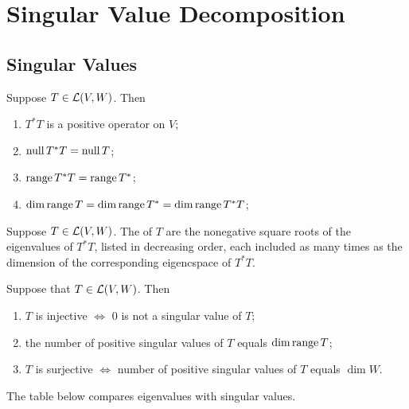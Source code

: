 \section{Singular Value Decomposition}

\subsection{Singular Values}

\begin{thm}[properties of $T*T$]
  \label{thm: properties of T^*T}
  Suppose $T \in \mathcal{L}(V,W)$. Then
  \begin{enumerate}[label=\textbf{(\alph*)}]
    \item $T^*T$ is a positive operator on $V$;
    \item $\operatorname{null} T^*T = \operatorname{null} T$;
    \item $\operatorname{range} T^*T = \operatorname{range} T^*$;
    \item $\dim \operatorname{range} T = \dim \operatorname{range} T^* = \dim  \operatorname{range} T^*T$;
  \end{enumerate}
\end{thm}

\begin{mydef}
  Suppose $T \in \mathcal{L} (V,W)$. The  of $T$ are the nonegative square roots of the eigenvalues of $T^*T$, listed in decreasing order, each included as many times as the dimension of the corresponding eigencspace of $T^*T$.
\end{mydef}

\begin{thm}
  Suppose that $T\in \mathcal{L} (V,W)$. Then
  \begin{enumerate} [label=\textbf{(\alph*)}]
    \item $T$ is injective $\iff$ $0$ is not a singular value of $T$;
    \item the number of positive singular values of $T$ equals $\dim \operatorname{range} T$;
    \item $T$ is surjective $\iff$ number of positive singular values of $T$ equals $\dim W$.
  \end{enumerate}
\end{thm}

The table below compares eigenvalues with singular values.

